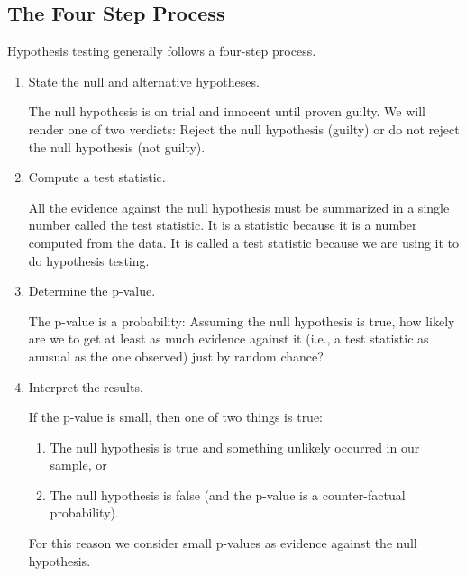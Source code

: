 \documentclass[twoside]{book}\usepackage[]{graphicx}\usepackage[]{xcolor}
\begin{document}
\subsection{The Four Step Process}
Hypothesis testing generally follows a four-step process.
\begin{enumerate}
	\item 
		State the null and alternative hypotheses.

		The null hypothesis is on trial and innocent until proven guilty.  We will
		render one of two verdicts:  Reject the null hypothesis (guilty) or do not reject
		the null hypothesis (not guilty).  

	\item
		Compute a test statistic.

		All the evidence against the null hypothesis must be summarized in a
		single number called the test statistic.  It is a statistic because 
		it is a number computed from the data.  It is called a test statistic
		because we are using it to do hypothesis testing.

	\item
		Determine the p-value.

		The p-value is a probability:  Assuming the null hypothesis is true,
		how likely are we to get at least as much evidence against it (i.e., a
		test statistic as anusual as the one observed) just by random chance?

	\item
		Interpret the results.

		If the p-value is small, then one of two things is true:
		\begin{enumerate}
			\item The null hypothesis is true and something unlikely occurred
				in our sample, or 
			\item The null hypothesis is false (and the
				p-value is a counter-factual probability).
		\end{enumerate}
		For this reason we consider small p-values as evidence against the null
		hypothesis.
\end{enumerate}
\end{document}
